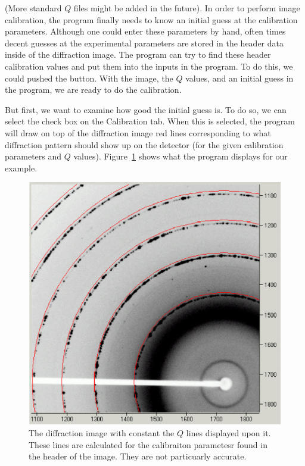 (More standard $Q$ files might be added in the future).
In order to perform image calibration, the program finally 
needs to know an initial guess at the calibration parameters. 
Although one could enter these parameters by hand, often 
times decent guesses at the experimental parameters are 
stored in the header data inside of the diffraction image. 
The program can try to find these header calibration values 
and put them into the inputs in the program. To do this, 
we could pushed the  button. With the 
image, the $Q$ values, and an initial guess in the program, 
we are ready to do the calibration. 

But first, we want to examine how good the initial guess 
is. To do so, we can select the 
check box on the Calibration tab. When this is selected, 
the program will draw
on top of the diffraction image red lines corresponding
to what diffraction pattern should show up on the
detector (for the given calibration parameters and $Q$
values). Figure~\ref{bad_calibration_diffraction_image}
shows what the program displays for our example.

\begin{figure}
    \centering
    \includegraphics[scale=.75]{figures/bad_calibration_diffraction_image.eps}
    \caption{The diffraction image with constant the $Q$
    lines displayed upon it. These lines are calculated
    for the calibraiton parametesr found in the
    header of the image. They are not particuarly
    accurate.}
    \label{bad_calibration_diffraction_image}
\end{figure}

